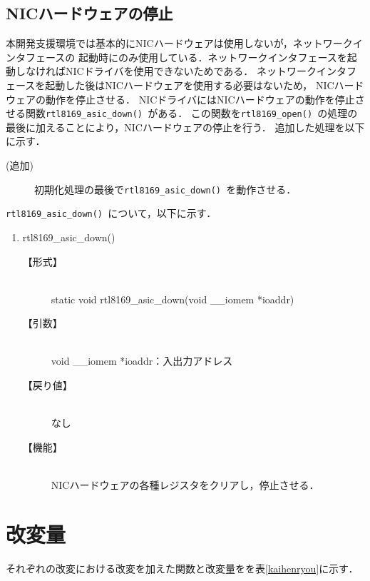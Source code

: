 \documentclass[12pt]{jsarticle}
\begin{document}
\subsection{NICハードウェアの停止}
本開発支援環境では基本的にNICハードウェアは使用しないが，ネットワークインタフェースの
起動時にのみ使用している．ネットワークインタフェースを起動しなければNICドライバを使用できないためである．
ネットワークインタフェースを起動した後はNICハードウェアを使用する必要はないため，
NICハードウェアの動作を停止させる．
NICドライバにはNICハードウェアの動作を停止させる関数{\tt rtl8169\_asic\_down() }がある．
この関数を{\tt rtl8169\_open() }の処理の最後に加えることにより，NICハードウェアの停止を行う．
追加した処理を以下に示す．
\begin{description}
    \item[(追加)]初期化処理の最後で{\tt rtl8169\_asic\_down() }を動作させる．
\end{description}
{\tt rtl8169\_asic\_down() }について，以下に示す．
\begin{enumerate}
    \item rtl8169\_asic\_down()
        \begin{description}
            \item[【形式】]\mbox{}\\
                static void rtl8169\_asic\_down(void \_\_iomem *ioaddr)
            \item[【引数】]\mbox{}\\
                void \_\_iomem *ioaddr：入出力アドレス
            \item[【戻り値】]\mbox{}\\
                なし
            \item[【機能】]\mbox{}\\
                NICハードウェアの各種レジスタをクリアし，停止させる．
        \end{description}
\end{enumerate}

\section{改変量}
それぞれの改変における改変を加えた関数と改変量をを表\ref{kaihenryou}に示す．
\end{document}
